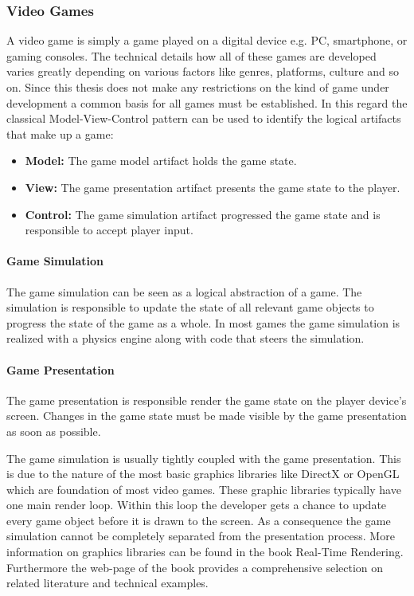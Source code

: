\subsubsection{Video Games}

A video game is simply a game played on a digital device e.g. PC, smartphone, or
gaming consoles. The technical details how all of these games are developed
varies greatly depending on various factors like genres, platforms, culture and
so on. Since this thesis does not make any restrictions on the kind of game
under development a common basis for all games must be established. In this
regard the classical Model-View-Control pattern can be used to identify the
logical artifacts that make up a game: 

\begin{itemize}
  \item \textbf{Model:} The game model artifact holds the game state.
  \item \textbf{View:} The game presentation artifact presents the game state to
  the player.
  \item \textbf{Control:} The game simulation artifact progressed the game
  state and is responsible to accept player input.
\end{itemize}

\paragraph{Game Simulation}

The game simulation can be seen as a logical abstraction of a game. The
simulation is responsible to update the state of all relevant game objects to
progress the state of the game as a whole. In most games the game simulation is
realized with a physics engine along with code that steers the simulation.

\paragraph{Game Presentation}

The game presentation is responsible render the game state on the player
device's screen. Changes in the game state must be made visible by the game
presentation as soon as possible.

The game simulation is usually tightly coupled with the game presentation. This
is due to the nature of the most basic graphics libraries like DirectX or OpenGL
which are foundation of most video games. These graphic libraries typically have
one main render loop. Within this loop the developer gets a chance to update
every game object before it is drawn to the screen. As a consequence the game
simulation cannot be completely separated from the presentation process. More
information on graphics libraries can be found in the book Real-Time
Rendering\cite{RTR3}. Furthermore the web-page of the book provides a
comprehensive selection on related literature and technical examples.

